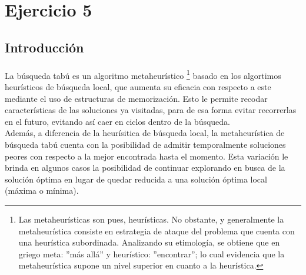 \section{Ejercicio 5}

\subsection{Introducción}

\paragraph{}
La búsqueda tabú es un algoritmo metaheurístico \footnote{
Las metaheurísticas son pues, heurísticas. No obstante, y generalmente la metaheurística consiste en estrategia de ataque del problema que cuenta con una heurística subordinada. Analizando su etimología, se obtiene que en griego meta: ''más allá'' y heurístico: ''encontrar''; lo cual evidencia que la metaheurística supone un nivel superior en cuanto a la heurística.} basado en los algortimos heurísticos de búsqueda local, que aumenta su eficacia con respecto a este mediante el uso de estructuras de memorización. Esto le permite recodar características de las soluciones ya visitadas, para de esa forma evitar recorrerlas en el futuro, evitando así caer en ciclos dentro de la búsqueda. \\
Además, a diferencia de la heurísitica de búsqueda local, la metaheurística de búsqueda tabú cuenta con la posibilidad de admitir temporalmente soluciones peores con respecto a la mejor encontrada hasta el momento. Esta variación le brinda en algunos casos la posibilidad de continuar explorando en busca de la solución óptima en lugar de quedar reducida a una solución óptima local (máxima o mínima).

